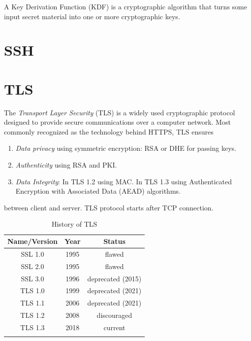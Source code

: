 \documentclass[a4paper, 12pt]{book} %
\begin{document}
A Key Derivation Function (KDF) is a cryptographic algorithm that turns some input secret material into one or more cryptographic keys.

    



\chapter{SSH}
    


\chapter{TLS}




The \emph{Transport Layer Security} (TLS) is a widely used cryptographic protocol designed to provide secure communications over a computer network. Most commonly recognized as the technology behind HTTPS, TLS ensures 
\begin{enumerate}
    \item \emph{Data privacy} using symmetric encryption: RSA or DHE for passing keys.
    \item \emph{Authenticity} using RSA and PKI.
    \item \emph{Data Integrity}: In TLS 1.2 using MAC. In TLS 1.3 using Authenticated Encryption with Associated Data (AEAD) algorithms.
\end{enumerate}
between client and server. TLS protocol starts after TCP connection. 

\begin{longtable}{|c|c|c|}\hline 
    Name/Version & Year & Status \\ \hline
    SSL 1.0 & 1995 & flawed \\ \hline
    SSL 2.0 & 1995 & flawed \\ \hline 
    SSL 3.0 & 1996 & deprecated  (2015) \\ \hline 
    TLS 1.0 & 1999 & deprecated (2021) \\ \hline 
    TLS 1.1 & 2006 & deprecated (2021) \\ \hline 
    TLS 1.2 & 2008 & discouraged \\ \hline 
    TLS 1.3 & 2018 & current \\ \hline 
    \caption{History of TLS}
\end{longtable}
\end{document}
